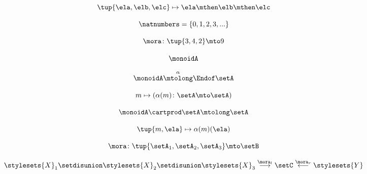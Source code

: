 \begin{forslides}
    \begin{equation}
        \label{eq:slides_multicategories_47}
        \tup{\ela, \elb, \elc} \mapsto \ela \mthen \elb \mthen \elc
    \end{equation}

    \begin{equation}
        \label{eq:slides_multicategories_48}
        \natnumbers = \{0, 1, 2, 3, ... \}
    \end{equation}

    \begin{equation}
        \label{eq:slides_multicategories_49}
        \mora \colon \tup{3,4,2} \mto 9
    \end{equation}

    \begin{equation}
        \label{eq:slides_multicategories_50}
        \monoidA
    \end{equation}

    \begin{equation}
        \label{eq:slides_multicategories_51}
        \monoidA \overset{\alpha}{\mtolong} \Endof \setA
    \end{equation}

    \begin{equation}
        \label{eq:slides_multicategories_52}
        m \mapsto ( \alpha(m) \colon \setA \mto \setA)
    \end{equation}

    \begin{equation}
        \label{eq:slides_multicategories_53}
        \monoidA \cartprod \setA \mtolong \setA
    \end{equation}

    \begin{equation}
        \label{eq:slides_multicategories_54}
        \tup{m, \ela} \mapsto \alpha(m)(\ela)
    \end{equation}

    \begin{equation}
        \label{eq:slides_multicategories_55}
        \mora \colon \tup{\setA_1, \setA_2, \setA_3} \mto \setB
    \end{equation}

    \begin{equation}
        \label{eq:slides_multicategories_56}
        \stylesets{X}_1 \setdisunion  \stylesets{X}_2 \setdisunion  \stylesets{X}_3 \overset{\mora_l}{\longrightarrow} \setC \overset{\mora_r}{\longleftarrow}  \stylesets{Y}
    \end{equation}


\end{forslides}

